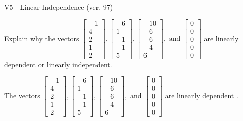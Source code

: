 \begin{exercise}
  \begin{exerciseTitle}V5 - Linear Independence (ver. 97)\end{exerciseTitle}
  \begin{exerciseStatement}
    Explain why the vectors \(\left[\begin{array}{r}
-1 \\
4 \\
2 \\
1 \\
2
\end{array}\right] , \left[\begin{array}{r}
-6 \\
1 \\
-1 \\
-1 \\
5
\end{array}\right] , \left[\begin{array}{r}
-10 \\
-6 \\
-6 \\
-4 \\
6
\end{array}\right] , \text{ and } \left[\begin{array}{r}
0 \\
0 \\
0 \\
0 \\
0
\end{array}\right]\) are linearly dependent or linearly independent.	


  \end{exerciseStatement}
  \begin{exerciseAnswer}
   The vectors \(\left[\begin{array}{r}
-1 \\
4 \\
2 \\
1 \\
2
\end{array}\right] , \left[\begin{array}{r}
-6 \\
1 \\
-1 \\
-1 \\
5
\end{array}\right] , \left[\begin{array}{r}
-10 \\
-6 \\
-6 \\
-4 \\
6
\end{array}\right] , \text{ and } \left[\begin{array}{r}
0 \\
0 \\
0 \\
0 \\
0
\end{array}\right]\) are 
  	 linearly dependent  .
  


  \end{exerciseAnswer}
\end{exercise}